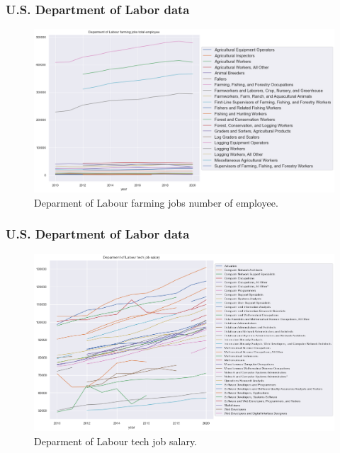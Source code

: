 \documentclass[10pt,mathserif]{beamer}
\begin{document}
	\begin{frame}
	\frametitle{U.S. Department of Labor data}
\begin{figure}[h]
	\begin{center}
		\includegraphics[width=\linewidth]{./photos/dolfarming.png}
	\end{center}
	\caption{Deparment of Labour farming jobs number of employee.}
	\label{dolfarming}
\end{figure}
\end{frame}

	\begin{frame}
	\frametitle{U.S. Department of Labor data}
\begin{figure}[h]
	\begin{center}
		\includegraphics[width=\linewidth]{./photos/departmentoflabour.png}
	\end{center}
	\caption{Deparment of Labour tech job salary.}
	\label{techsalary}
\end{figure}
\end{frame}
\end{document}
